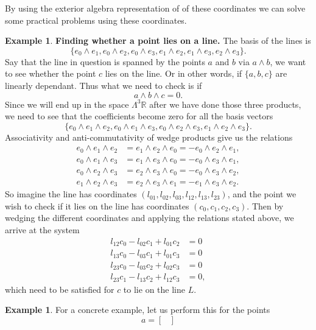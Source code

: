 \documentclass[a4paper,12pt]{book}
\theoremstyle{plain}
\theoremstyle{definition}
\newtheorem{Example}[equation]{Example}
\begin{document}
By using the exterior algebra representation of of these coordinates we can solve some
practical problems using these coordinates.
\begin{Example}
	\textbf{Finding whether a point lies on a line.}
	The basis of the lines is
	\[ \{ e_0 \wedge e_1, e_0 \wedge e_2, e_0 \wedge e_3,
	e_1 \wedge e_2, e_1 \wedge e_3, e_2 \wedge e_3 \}. \] Say that the line in question
	is spanned by the points \( a \) and \( b \) via \( a \wedge b \), we want to see
	whether the point \( c \) lies on the line. Or in other words, if \( \{a,b,c\} \)
	are linearly dependant. Thus what we need to check is if
	\[
		a \wedge b \wedge c = 0.
	\]
	Since we will end up in the space \( \Lambda^3 \mathbb{R} \) after we have done
	those three products, we need to see that the coefficients become zero for all
	the basis vectors
	\[ \{ e_0 \wedge e_1 \wedge e_2, e_0 \wedge e_1 \wedge e_3,
	e_0 \wedge e_2 \wedge e_3, e_1 \wedge e_2 \wedge e_3 \}. \]
	Associativity and anti-commutativity of wedge products give us the relations
	\begin{align*}
		e_0 \wedge e_1 \wedge e_2 &= e_1 \wedge e_2 \wedge e_0 = - e_0 \wedge e_2 \wedge e_1, \\
		e_0 \wedge e_1 \wedge e_3 &= e_1 \wedge e_3 \wedge e_0 = - e_0 \wedge e_3 \wedge e_1, \\
		e_0 \wedge e_2 \wedge e_3 &= e_2 \wedge e_3 \wedge e_0 = - e_0 \wedge e_3 \wedge e_2, \\
		e_1 \wedge e_2 \wedge e_3 &= e_2 \wedge e_3 \wedge e_1 = - e_1 \wedge e_3 \wedge e_2.
	\end{align*}
	So imagine the line has coordinates \( (l_{01}, l_{02}, l_{03}, l_{12}, l_{13}, l_{23}) \),
	and the point we wish to check if it lies on the line has coordinates
	\( (c_0, c_1, c_2, c_3) \). Then by wedging the different coordinates and applying the relations
	stated above, we arrive at the system
	\begin{align*}
		l_{12} c_0 - l_{02} c_1 + l_{01} c_2 &= 0 \\
		l_{13} c_0 - l_{03} c_1 + l_{01} c_3 &= 0 \\
		l_{23} c_0 - l_{03} c_2 + l_{02} c_3 &= 0 \\
		l_{23} c_1 - l_{13} c_2 + l_{12} c_3 &= 0,
	\end{align*}
	which need to be satisfied for \( c \) to lie on the line \( L \).
	\begin{Example}
		For a concrete example, let us perform this for the points
		\[
			a = \begin{bmatrix}

\end{bmatrix}\]
\end{Example}
\end{Example}
\end{document}
